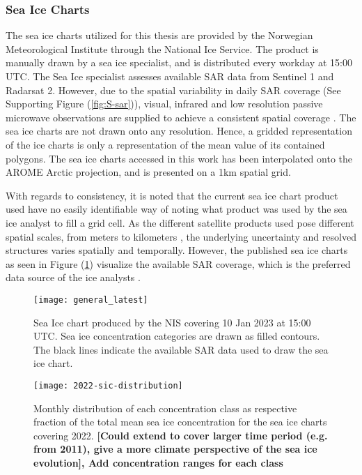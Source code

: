 \documentclass[../main/thesis.tex]{subfiles}
\begin{document}
\subsubsection{Sea Ice Charts}
The sea ice charts utilized for this thesis are provided by the Norwegian Meteorological Institute through the National Ice Service. The product is manually drawn by a sea ice specialist, and is distributed every workday at 15:00 UTC. The Sea Ice specialist assesses available SAR data from Sentinel 1 and Radarsat 2. However, due to the spatial variability in daily SAR coverage (See Supporting Figure (\ref{fig:S-sar})), visual, infrared and low resolution passive microwave observations are supplied to achieve a consistent spatial coverage \citep{Dinessen2020}. The sea ice charts are not drawn onto any resolution. Hence, a gridded representation of the ice charts is only a representation of the mean value of its contained polygons. The sea ice charts accessed in this work has been interpolated onto the AROME Arctic \citep{Mueller2017} projection, and is presented on a 1km spatial grid.

With regards to consistency, it is noted that the current sea ice chart product used have no easily identifiable way of noting what product was used by the sea ice analyst to fill a grid cell. As the different satellite  products used pose different spatial scales, from meters to kilometers \citep{Dinessen2020}, the underlying uncertainty and resolved structures varies spatially and temporally. However, the published sea ice charts as seen in Figure (\ref{fig:icechart}) visualize the available SAR coverage, which is the preferred data source of the ice analysts \citep{Dinessen2020}. 

\begin{figure}
    \texttt{[image: general\_latest]}
    \caption{\label{fig:icechart}Sea Ice chart produced by the NIS covering 10 Jan 2023 at 15:00 UTC. Sea ice concentration categories are drawn as filled contours. The black lines indicate the available SAR data used to draw the sea ice chart.}
\end{figure}

\begin{figure}
    \texttt{[image: 2022-sic-distribution]}
    \caption{\label{fig:2022-areadist-sic}Monthly distribution of each concentration class as respective fraction of the total mean sea ice concentration for the sea ice charts covering 2022. \textbf{[Could extend to cover larger time period (e.g. from 2011), give a more climate perspective of the sea ice evolution], Add concentration ranges for each class}}
\end{figure}
\end{document}
